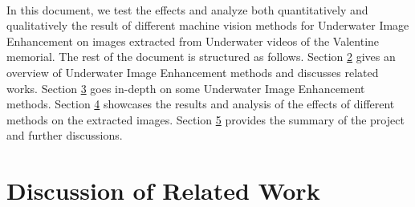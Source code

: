 \documentclass[a4paper,11pt,oneside]{article}
\begin{document}
  \\
  In this document, we test the effects and analyze both quantitatively and qualitatively the result of different machine vision methods for Underwater Image Enhancement on images extracted from Underwater videos of the Valentine memorial. The rest of the document is structured as follows. Section \hyperref[sec:2]{2} gives an overview of Underwater Image Enhancement methods and discusses related works. Section \hyperref[sec:3]{3} goes in-depth on some Underwater Image Enhancement methods. Section \hyperref[sec:4]{4} showcases the results and analysis of the effects of different methods on the extracted images. Section \hyperref[sec:5]{5} provides the summary of the project and further discussions.  

 

  \section{Discussion of Related Work}
  \label{sec:2}

\end{document}
